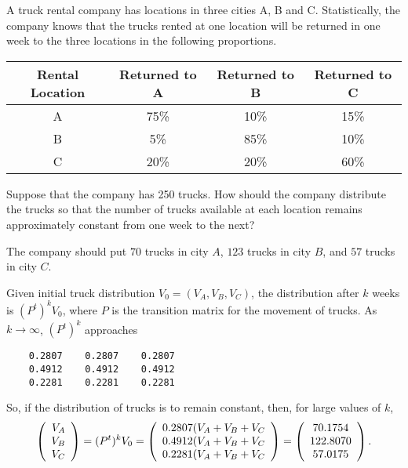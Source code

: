 \documentclass{ximera}
\begin{document}
\begin{exercise} \label{c4.10.6}
A truck rental company has locations in three cities A, B and C.
Statistically, the company knows that the trucks rented at one location will
be returned in one week to the three locations in the following proportions.
\begin{center}
\begin{tabular}{|c||c|c|c|}
\hline
Rental Location &  Returned to A & Returned to B & Returned to C\\
\hline
A  & 75\% & 10\%  & 15\% \\
\hline
B & 5\% & 85\% & 10\% \\
\hline
C & 20\% & 20\% & 60\%\\
\hline
\end{tabular}
\end{center}
Suppose that the company has 250 trucks.  How should the company distribute
the trucks so that the number of trucks available at each location remains
approximately constant from one week to the next?

\begin{solution}

\ans The company should put $70$ trucks in city $A$, $123$ trucks in city
$B$, and $57$ trucks in city $C$.

\soln Given initial truck distribution $V_0 = (V_A,V_B,V_C)$, the
distribution after $k$ weeks is $(P^t)^kV_0$, where $P$ is the transition
matrix for the movement of trucks.  As $k \rightarrow \infty$, $(P^t)^k$
approaches
\begin{verbatim}
    0.2807    0.2807    0.2807
    0.4912    0.4912    0.4912
    0.2281    0.2281    0.2281
\end{verbatim}
So, if the distribution of trucks is to remain constant, then, for large
values of $k$,
\[
\left(\begin{array}{r} V_A \\ V_B \\ V_C\end{array}\right) = (P^t)^kV_0 = \left(\begin{array}{c} 0.2807(V_A +
V_B + V_C \\ 0.4912(V_A + V_B + V_C \\ 0.2281(V_A + V_B + V_C\end{array}\right) =
\left(\begin{array}{c} 70.1754 \\ 122.8070 \\ 57.0175\end{array}\right).
\]

\end{solution}
\end{exercise}
\end{document}

